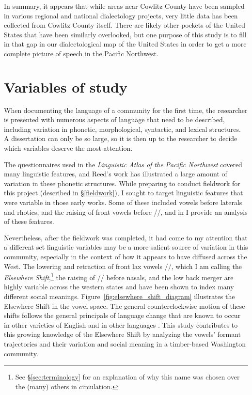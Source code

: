 In summary, it appears that while areas near Cowlitz County have been sampled in various regional and national dialectology projects, very little data has been collected from Cowlitz County itself. There are likely other pockets of the United States that have been similarly overlooked, but one purpose of this study is to fill in that gap in our dialectological map of the United States in order to get a more complete picture of speech in the Pacific Northwest.


\section{Variables of study}

When documenting the language of a community for the first time, the researcher is presented with numerous aspects of language that need to be described, including variation in phonetic, morphological, syntactic, and lexical structures. A dissertation can only be so large, so it is then up to the researcher to decide which variables deserve the most attention.

The questionnaires used in the \textit{Linguistic Atlas of the Pacific Northwest} covered many linguistic features, and Reed's work has illustrated a large amount of variation in these phonetic structures. While preparing to conduct fieldwork for this project (described in \S\ref{fieldwork}), I sought to target linguistic features that were variable in those early works. Some of these included vowels before laterals and rhotics, and the raising of front vowels before //, and in \citet{stanley_2017_ADS, stanley_2018_pwpl} I provide an analysis of these features.

Nevertheless, after the fieldwork was completed, it had come to my attention that a different set linguistic variables may be a more salient source of variation in this community, especially in the context of how it appears to have diffused across the West. The lowering and retraction of front lax vowels //, which I am calling the \textit{Elsewhere Shift},\footnote{See \S\ref{sec:terminology} for an explanation of why this name was chosen over the (many) others in circulation.} the raising of /\textipa{\ae}/ before nasals, and the low back merger are highly variable across the western states and have been shown to index many different social meanings. Figure~\ref{fig:elsewhere_shift_diagram} illustrates the Elsewhere Shift in the vowel space. The general counterclockwise motion of these shifts follows the general principals of language change that are known to occur in other varieties of English and in other languages \citep{labov_1994, harrington_etal_2011}. This study contributes to this growing knowledge of the Elsewhere Shift by analyzing the vowels' formant trajectories and their variation and social meaning in a timber-based Washington community.

